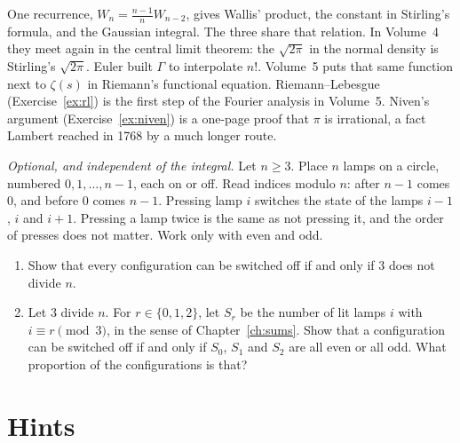 \begin{beauty}
One recurrence, $W_n=\frac{n-1}nW_{n-2}$, gives Wallis' product, the constant in Stirling's formula, and the Gaussian integral. The three share that relation. In Volume~4 they meet again in the central limit theorem: the $\sqrt{2\pi}$ in the normal density is Stirling's $\sqrt{2\pi}$. Euler built $\Gamma$ to interpolate $n!$. Volume~5 puts that same function next to $\zeta(s)$ in Riemann's functional equation. Riemann--Lebesgue (Exercise~\ref{ex:rl}) is the first step of the Fourier analysis in Volume~5. Niven's argument (Exercise~\ref{ex:niven}) is a one-page proof that $\pi$ is irrational, a fact Lambert reached in 1768 by a much longer route.
\end{beauty}

\begin{exercise}[$\star\star$]\label{pb:lightsout}
\emph{Optional, and independent of the integral.} Let $n\ge3$. Place $n$ lamps on a circle, numbered $0,1,\dots,n-1$, each on or off. Read indices modulo $n$: after $n-1$ comes $0$, and before $0$ comes $n-1$. Pressing lamp $i$ switches the state of the lamps $i-1$, $i$ and $i+1$. Pressing a lamp twice is the same as not pressing it, and the order of presses does not matter. Work only with even and odd.
\begin{enumerate}[label=(\alph*)]
\item Show that every configuration can be switched off if and only if $3$ does not divide $n$.
\item Let $3$ divide $n$. For $r\in\{0,1,2\}$, let $S_r$ be the number of lit lamps $i$ with $i\equiv r\pmod 3$, in the sense of Chapter~\ref{ch:sums}. Show that a configuration can be switched off if and only if $S_0$, $S_1$ and $S_2$ are all even or all odd. What proportion of the configurations is that?
\end{enumerate}
\end{exercise}

\section{Hints}


